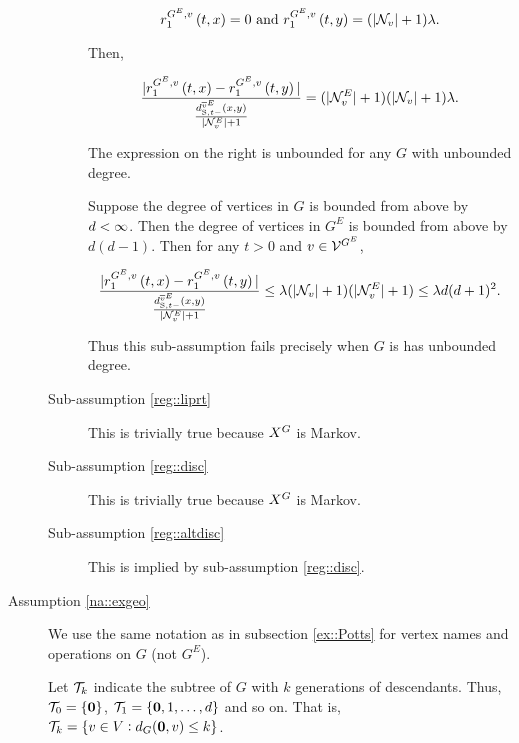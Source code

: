 \begin{description}
\begin{description}
\[\rate\gvpara{G^E}{v}\stpara{1}\tmepro{t}{\xf}{} = 0\te{ and }\rate\gvpara{G^E}{v}\stpara{1}\tmepro{t}{\xg}{} = (|\neigh{v}|+1)\lambda.\]

Then,

\[\frac{|\rate\gvpara{G^E}{v}\stpara{1}\tmepro{t}{\xf}{}-\rate\gvpara{G^E}{v}\stpara{1}\tmepro{t}{\xg}{}|}{\frac{\stmet{t-}\vpara{\ecl{v}}(\xf,\xg)}{|\eneigh{v}|+1}} = (|\eneigh{v}|+1)(|\neigh{v}|+1)\lambda.\]

The expression on the right is unbounded for any \(G\) with unbounded degree.


\ind Suppose the degree of vertices in \(G\) is bounded from above by \(d < \infty\). Then the degree of vertices in \(G^E\) is bounded from above by \(d(d-1)\). Then for any \(t > 0\) and \(v \in \mathcal{V}^{G^E}\),

\[\frac{|\rate\stpara{1}\gvpara{G^E}{v}\tmepro{t}{\xf}{} - \rate\stpara{1}\gvpara{G^E}{v}\tmepro{t}{\xg}{}|}{\frac{\stmet{t-}^{\ecl{v}}(\xf,\xg)}{|\eneigh{v}|+1}} \leq \lambda(|\neigh{v}|+1)(|\eneigh{v}|+1) \leq \lambda \d(\d+1)^2.\]

Thus this sub-assumption fails precisely when \(G\) is has unbounded degree. 


\item[Sub-assumption \ref{reg::liprt}] This is trivially true because \(X^{G}\) is Markov.

\item[Sub-assumption \ref{reg::disc}] This is trivially true because \(X^{G}\) is Markov.

\item[Sub-assumption \ref{reg::altdisc}] This is implied by sub-assumption \ref{reg::disc}.
\end{description}

\item[Assumption \ref{na::exgeo}] We use the same notation as in subsection \ref{ex::Potts} for vertex names and operations on \(G\) (not \(G^E\)).

\ind Let \(\mathcal{T}_{k}\) indicate the subtree of \(G\) with \(k\) generations of descendants. Thus, \(\mathcal{T}_{0} = \{\mathbf{0}\}\), \(\mathcal{T}_{1} = \{\mathbf{0},1,\dots,d\}\) and so on. That is, \(\mathcal{T}_{k} = \{v \in V: d_G(\mathbf{0},v) \leq k\}\).


\end{description}
